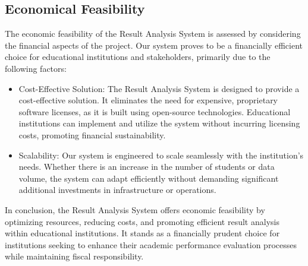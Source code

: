 \documentclass{nascproject}
\begin{document}
    \subsection{Economical Feasibility}
    The economic feasibility of the Result Analysis System is assessed by considering the financial aspects of the project. Our system proves to be a financially efficient choice for educational institutions and stakeholders, primarily due to the following factors:
    \begin{itemize}
    	\item Cost-Effective Solution: The Result Analysis System is designed to provide a cost-effective solution. It eliminates the need for expensive, proprietary software licenses, as it is built using open-source technologies. Educational institutions can implement and utilize the system without incurring licensing costs, promoting financial sustainability.
    	\item Scalability: Our system is engineered to scale seamlessly with the institution's needs. Whether there is an increase in the number of students or data volume, the system can adapt efficiently without demanding significant additional investments in infrastructure or operations.
    \end{itemize}
In conclusion, the Result Analysis System offers economic feasibility by optimizing resources, reducing costs, and promoting efficient result analysis within educational institutions. It stands as a financially prudent choice for institutions seeking to enhance their academic performance evaluation processes while maintaining fiscal responsibility.
\end{document}
